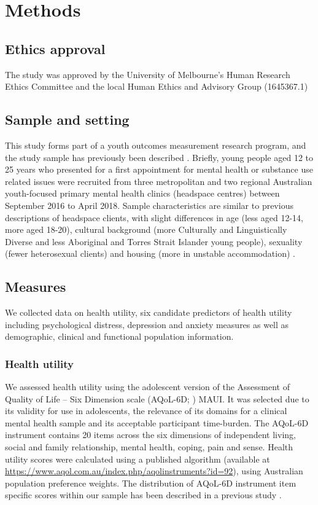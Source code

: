 \documentclass[
  journal=largetwo,
  manuscript=original-article,
  year=2023-Submission,
]{cup-journal}
\begin{document}
\section{Methods}

\subsection{Ethics approval}

The study was approved by the University of Melbourne's Human Research Ethics Committee and the local Human Ethics and Advisory Group (1645367.1)

\subsection{Sample and setting}

This study forms part of a youth outcomes measurement research program, and the study sample has previously been described \autocite{Filia_2021}. Briefly, young people aged 12 to 25 years who presented for a first appointment for mental health or substance use related issues were recruited from three metropolitan and two regional Australian youth-focused primary mental health clinics (headspace centres) between September 2016 to April 2018. Sample characteristics are similar to previous descriptions of headspace clients, with slight differences in age (less aged 12-14, more aged 18-20), cultural background (more Culturally and Linguistically Diverse and less Aboriginal and Torres Strait Islander young people), sexuality (fewer heterosexual clients) and housing (more in unstable accommodation) \autocite{Filia_2021}.

\subsection{Measures}

We collected data on health utility, six candidate predictors of health utility including psychological distress, depression and anxiety measures as well as demographic, clinical and functional population information.

\subsubsection{Health utility}

We assessed health utility using the adolescent version of the Assessment of Quality of Life -- Six Dimension scale (AQoL-6D; \autocite{RN10}) MAUI. It was selected due to its validity for use in adolescents, the relevance of its domains for a clinical mental health sample \autocite{RN6} and its acceptable participant time-burden. The AQoL-6D instrument contains 20 items across the six dimensions of independent living, social and family relationship, mental health, coping, pain and sense. Health utility scores were calculated using a published algorithm (available at \url{https://www.aqol.com.au/index.php/aqolinstruments?id=92}), using Australian population preference weights. The distribution of AQoL-6D instrument item specific scores within our sample has been described in a previous study \autocite{cotton_hamilton_filia_2022}.
\end{document}

